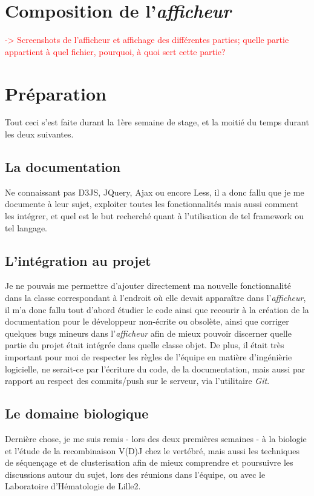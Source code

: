 \documentclass{report}
\begin{document}
\section{Composition de l'\textit{afficheur}}

\textcolor{red}{-> Screenshots de l'afficheur et affichage des différentes parties; quelle partie appartient à quel fichier, pourquoi, à quoi sert cette partie?}

\section{Préparation}
Tout ceci s'est faite durant la 1ère semaine de stage, et la moitié du temps durant les deux suivantes.

\subsection{La documentation}
Ne connaissant pas D3JS, JQuery, Ajax ou encore Less, il a donc fallu que je me documente à leur sujet, exploiter toutes les fonctionnalités mais aussi comment les intégrer, et quel est le but recherché quant à l'utilisation de tel framework ou tel langage.

\subsection{L'intégration au projet}
Je ne pouvais me permettre d'ajouter directement ma nouvelle fonctionnalité dans la classe correspondant à l'endroit où elle devait apparaître dans l'\textit{afficheur}, il m'a donc fallu tout d'abord étudier le code ainsi que recourir à la création de la documentation pour le développeur non-écrite ou obsolète, ainsi que corriger quelques bugs mineurs dans l'\textit{afficheur} afin de mieux pouvoir discerner quelle partie du projet était intégrée dans quelle classe objet.
\newline
De plus, il était très important pour moi de respecter les règles de l'équipe en matière d'ingénièrie logicielle, ne serait-ce par l'écriture du code, de la documentation, mais aussi par rapport au respect des commits/push sur le serveur, via l'utilitaire \textit{Git}.

\subsection{Le domaine biologique}
Dernière chose, je me suis remis - lors des deux premières semaines - à la biologie et l'étude de la recombinaison V(D)J chez le vertébré, mais aussi les techniques de séquençage et de clusterisation afin de mieux comprendre et poursuivre les discussions autour du sujet, lors des réunions dans l'équipe, ou avec le Laboratoire d'Hématologie de Lille2.
\end{document}
